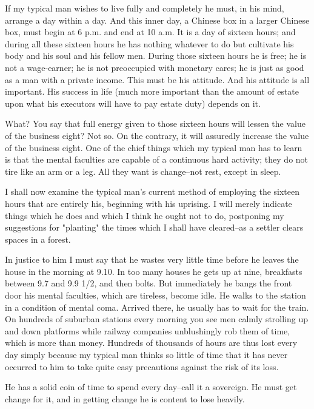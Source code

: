 If my typical man wishes to live fully and completely he must, in his
mind, arrange a day within a day.  And this inner day, a Chinese box in
a larger Chinese box, must begin at 6 p.m. and end at 10 a.m. It is a
day of sixteen hours; and during all these sixteen hours he has nothing
whatever to do but cultivate his body and his soul and his fellow men.
During those sixteen hours he is free; he is not a wage-earner; he is
not preoccupied with monetary cares; he is just as good as a man with a
private income.  This must be his attitude. And his attitude is all
important.  His success in life (much more important than the amount of
estate upon what his executors will have to pay estate duty) depends on
it.

What?  You say that full energy given to those sixteen hours will
lessen the value of the business eight?  Not so.  On the contrary, it
will assuredly increase the value of the business eight.  One of the
chief things which my typical man has to learn is that the mental
faculties are capable of a continuous hard activity; they do not tire
like an arm or a leg.  All they want is change--not rest, except in
sleep.

I shall now examine the typical man's current method of employing the
sixteen hours that are entirely his, beginning with his uprising.  I
will merely indicate things which he does and which I think he ought
not to do, postponing my suggestions for "planting" the times which I
shall have cleared--as a settler clears spaces in a forest.

In justice to him I must say that he wastes very little time before he
leaves the house in the morning at 9.10.  In too many houses he gets up
at nine, breakfasts between 9.7 and 9.9 1/2, and then bolts. But
immediately he bangs the front door his mental faculties, which are
tireless, become idle.  He walks to the station in a condition of
mental coma.  Arrived there, he usually has to wait for the train.  On
hundreds of suburban stations every morning you see men calmly
strolling up and down platforms while railway companies unblushingly
rob them of time, which is more than money.  Hundreds of thousands of
hours are thus lost every day simply because my typical man thinks so
little of time that it has never occurred to him to take quite easy
precautions against the risk of its loss.

He has a solid coin of time to spend every day--call it a sovereign. He
must get change for it, and in getting change he is content to lose
heavily.

